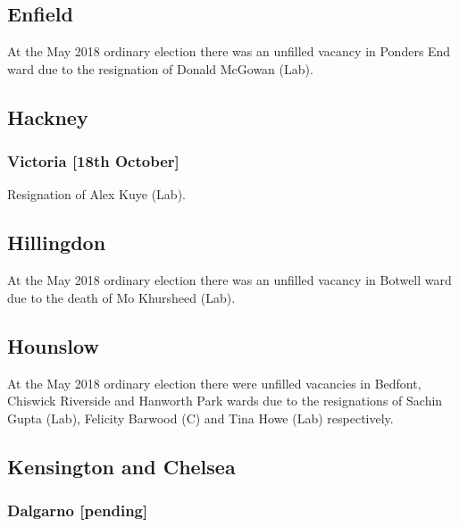 \documentclass[a4paper,openany]{book}
\begin{document}
\begin{resultsiii}
\subsection*{Enfield}

At the May 2018 ordinary election there was an unfilled vacancy in Ponders End ward due to the resignation of Donald McGowan (Lab).

\subsection*{Hackney}

\subsubsection*{Victoria
\hspace*{\fill}\nolinebreak[1]%
\enspace\hspace*{\fill}
[18th October]}


Resignation of Alex Kuye (Lab).

\subsection*{Hillingdon}

At the May 2018 ordinary election there was an unfilled vacancy in Botwell ward due to the death of Mo Khursheed (Lab).

\subsection*{Hounslow}

At the May 2018 ordinary election there were unfilled vacancies in Bedfont, Chiswick Riverside and Hanworth Park wards due to the resignations of Sachin Gupta (Lab), Felicity Barwood (C) and Tina Howe (Lab) respectively.

\subsection*{Kensington and Chelsea}

\subsubsection*{Dalgarno
\hspace*{\fill}\nolinebreak[1]%
\enspace\hspace*{\fill}
[pending]}


\end{resultsiii}
\end{document}
